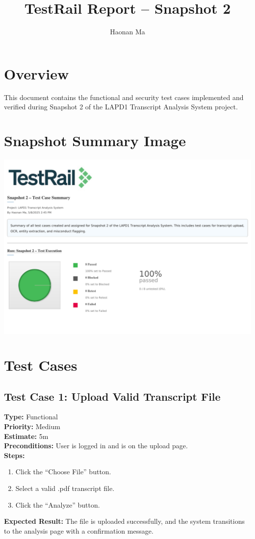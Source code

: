 \documentclass[12pt]{article}
\title{TestRail Report – Snapshot 2}
\author{Haonan Ma}
\date{}
\begin{document}
\maketitle

\section*{Overview}
This document contains the functional and security test cases implemented and verified during Snapshot 2 of the LAPD1 Transcript Analysis System project.

\section*{Snapshot Summary Image}
\begin{center}
    \includegraphics[width=\textwidth]{snapshot2image}
\end{center}

\section*{Test Cases}

\subsection*{Test Case 1: Upload Valid Transcript File}
\textbf{Type:} Functional \\
\textbf{Priority:} Medium \\
\textbf{Estimate:} 5m \\
\textbf{Preconditions:} User is logged in and is on the upload page. \\
\textbf{Steps:}
\begin{enumerate}[label=\arabic*.]
\item Click the “Choose File” button.
\item Select a valid .pdf transcript file.
\item Click the “Analyze” button.
\end{enumerate}
\textbf{Expected Result:} The file is uploaded successfully, and the system transitions to the analysis page with a confirmation message.
\end{document}
